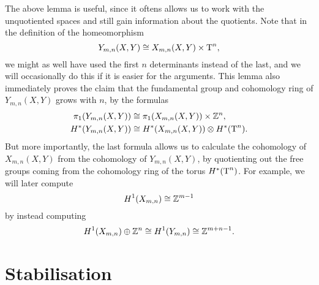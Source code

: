 The above lemma is useful, since it oftens allows us to work with the
unquotiented spaces and still gain information about the
quotients. Note that in the definition of the homeomorphism
\[ Y_{m,n}(X,Y) \cong X_{m,n}(X,Y) \times \operatorname{T}^n , \]
we might as well have
used the first $n$ determinants instead of the last, and we will
occasionally do this if it is easier for the arguments. 
This lemma also immediately proves the claim that the fundamental
group and cohomology ring of $Y_{m,n}(X,Y)$ grows with $n$, by the
formulas
\begin{align*}
  \pi_1(Y_{m,n}(X,Y)) &\cong \pi_1(X_{m,n}(X,Y)) \times \mathbb{Z}^n, \\
  H^*(Y_{m,n}(X,Y)) &\cong H^*(X_{m,n}(X,Y)) \otimes H^*(\operatorname{T}^n).
\end{align*}
But more importantly, the last formula allows us to calculate the
cohomology of $X_{m,n}(X,Y)$ from the cohomology of $Y_{m,n}(X,Y)$, by
quotienting out the free groups coming from the cohomology ring of the
torus $H^*(\operatorname{T}^n)$. For example, we will later compute 
\[ H^1(X_{m,n}) \cong \mathbb{Z}^{m-1} \]
by instead computing
\[ H^1(X_{m,n}) \oplus \mathbb{Z}^n \cong H^1(Y_{m,n}) \cong \mathbb{Z}^{m+n-1}. \]

\section{Stabilisation} 
\label{sec:rum-stabil}

